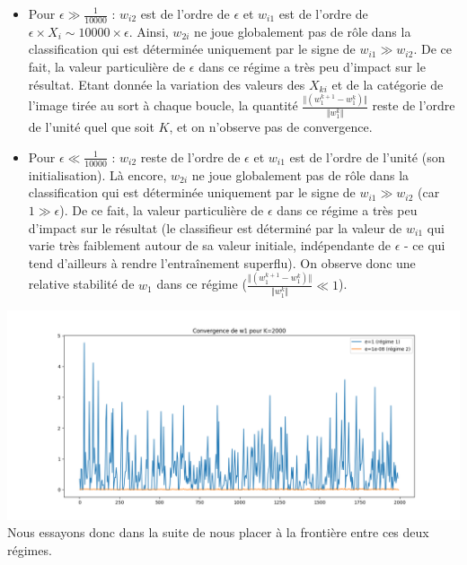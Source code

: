 \documentclass[a4paper,11pt]{article}
\begin{document}
	\begin{itemize}
		\item Pour $\epsilon \gg \frac{1}{10000}$ : $w_{i2}$ est de l'ordre de $\epsilon$ et $w_{i1}$ est de l'ordre de $\epsilon \times X_i \sim 10000 \times \epsilon$. Ainsi, $w_{2i}$ ne joue globalement pas de rôle dans la classification qui est déterminée uniquement par le signe de $w_{i1} \gg w_{i2}$. De ce fait, la valeur particulière de $\epsilon$ dans ce régime a très peu d'impact sur le résultat. Etant donnée la variation des valeurs des $X_{ki}$ et de la catégorie de l'image tirée au sort à chaque boucle, la quantité $  \frac{\Vert(w_1^{k+1} - w_1^{k})\Vert}{\Vert w_1^{k}\Vert}$ reste de l'ordre de l'unité quel que soit $K$, et on n'observe pas de convergence.\\
		
		\item Pour $\epsilon \ll \frac{1}{10000}$ : $w_{i2}$ reste de l'ordre de $\epsilon$ et $w_{i1}$ est de l'ordre de l'unité (son initialisation). Là encore, $w_{2i}$ ne joue globalement pas de rôle dans la classification qui est déterminée uniquement par le signe de $w_{i1} \gg w_{i2}$ (car $1 \gg \epsilon$). De ce fait, la valeur particulière de $\epsilon$ dans ce régime a très peu d'impact sur le résultat (le classifieur est déterminé par la valeur de $w_{i1}$ qui varie très faiblement autour de sa valeur initiale, indépendante de $\epsilon$ - ce qui tend d'ailleurs à rendre l'entraînement superflu). On observe donc une relative stabilité de $w_1$ dans ce régime ($  \frac{\Vert(w_1^{k+1} - w_1^{k})\Vert}{\Vert w_1^{k}\Vert} \ll 1$). \\
	\end{itemize}
\includegraphics[width=15cm]{"Fig4 Cv w1 2 regimes"}\\


Nous essayons donc dans la suite de nous placer à la frontière entre ces deux régimes.\\
\end{document}
